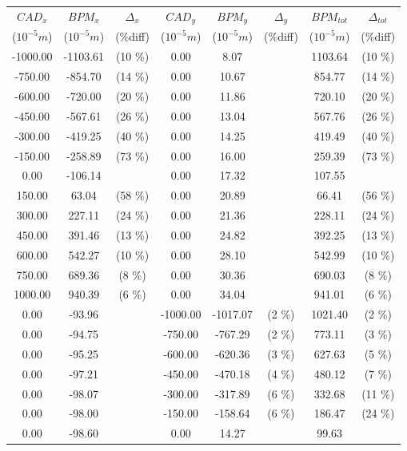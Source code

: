 \begin{table}
\centering
\begin{tabular}{c c c c c c c c}
\toprule
\textbf{$CAD_{x}$} & \textbf{$BPM_{x}$ } & \textbf{$\Delta_{x}$} &\textbf{$CAD_{y}$} & \textbf{$BPM_{y}$} & \textbf{$\Delta_{y}$} & \textbf{$BPM_{tot}$} & \textbf{$\Delta_{tot}$} \\
($10^{-5} m$) & ($10^{-5} m$) & (\%diff) & ($10^{-5} m$) & ($10^{-5} m$) & (\%diff) & ($10^{-5} m$) & (\%diff) \\
\midrule
-1000.00 & -1103.61 &  (10 \%) & 0.00 & 8.07 &  & 1103.64 &  (10 \%)\\
-750.00 & -854.70 &  (14 \%) & 0.00 & 10.67 &  & 854.77 &  (14 \%)\\
-600.00 & -720.00 &  (20 \%) & 0.00 & 11.86 &  & 720.10 &  (20 \%)\\
-450.00 & -567.61 &  (26 \%) & 0.00 & 13.04 &  & 567.76 &  (26 \%)\\
-300.00 & -419.25 &  (40 \%) & 0.00 & 14.25 &  & 419.49 &  (40 \%)\\
-150.00 & -258.89 &  (73 \%) & 0.00 & 16.00 &  & 259.39 &  (73 \%)\\
0.00 & -106.14 &  & 0.00 & 17.32 &  & 107.55 & \\
150.00 & 63.04 &  (58 \%) & 0.00 & 20.89 &  & 66.41 &  (56 \%)\\
300.00 & 227.11 &  (24 \%) & 0.00 & 21.36 &  & 228.11 &  (24 \%)\\
450.00 & 391.46 &  (13 \%) & 0.00 & 24.82 &  & 392.25 &  (13 \%)\\
600.00 & 542.27 &  (10 \%) & 0.00 & 28.10 &  & 542.99 &  (10 \%)\\
750.00 & 689.36 &  (8 \%) & 0.00 & 30.36 &  & 690.03 &  (8 \%)\\
1000.00 & 940.39 &  (6 \%) & 0.00 & 34.04 &  & 941.01 &  (6 \%)\\
0.00 & -93.96 &  & -1000.00 & -1017.07 &  (2 \%) & 1021.40 &  (2 \%)\\
0.00 & -94.75 &  & -750.00 & -767.29 &  (2 \%) & 773.11 &  (3 \%)\\
0.00 & -95.25 &  & -600.00 & -620.36 &  (3 \%) & 627.63 &  (5 \%)\\
0.00 & -97.21 &  & -450.00 & -470.18 &  (4 \%) & 480.12 &  (7 \%)\\
0.00 & -98.07 &  & -300.00 & -317.89 &  (6 \%) & 332.68 &  (11 \%)\\
0.00 & -98.00 &  & -150.00 & -158.64 &  (6 \%) & 186.47 &  (24 \%)\\
0.00 & -98.60 &  & 0.00 & 14.27 &  & 99.63 & \\

\end{tabular}
\end{table}
